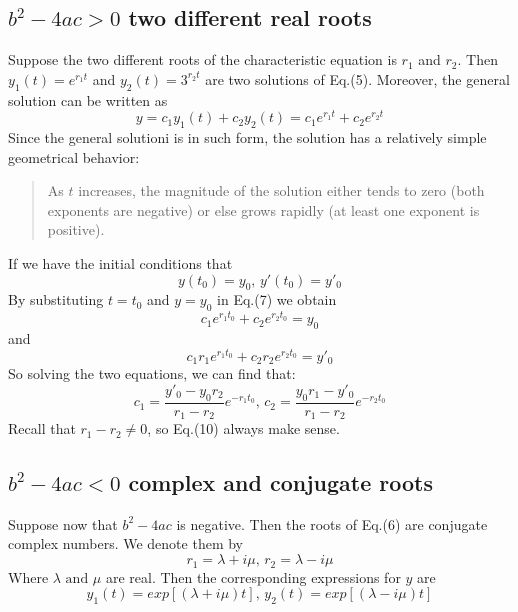 \documentclass{article}
\begin{document}
\subsection{$b^2 - 4ac > 0$ two different real roots}
Suppose the two different roots of the characteristic equation is $r_1$ and $r_2$. Then $y_1(t) = e^{r_1t}$ and $y_2(t) = 3^{r_2t}$ are two solutions of Eq.(5). Moreover, the general solution can be written as 
\begin{equation}
	y = c_1y_1(t) + c_2y_2(t) = c_1e^{r_1t}+c_2e^{r_2t}
\end{equation}
Since the general solutioni is in such form, the solution has a relatively simple geometrical behavior: 
\begin{quote}
	As $t$ increases, the magnitude of the solution either tends to zero (both exponents are negative) or else grows rapidly (at least one exponent is positive).
\end{quote}
If we have the initial conditions that \[y(t_0) = y_0\text{,  } y'(t_0) = y'_0\]
By substituting $t=t_0$ and $y = y_0$ in Eq.(7) we obtain
\begin{equation}
	c_1e^{r_1t_0}+c_2e^{r_2t_0} = y_0
\end{equation}
and
\begin{equation}
	c_1r_1e^{r_1t_0}+c_2r_2e^{r_2t_0} = y'_0
\end{equation}
So solving the two equations, we can find that:
\begin{equation}
	c_1 = \frac{y'_0-y_0r_2}{r_1-r_2}e^{-r_1t_0} \text{,  } c_2 = \frac{y_0r_1-y'_0}{r_1-r_2}e^{-r_2t_0}
\end{equation}
Recall that $r_1-r_2 \neq 0$, so Eq.(10) always make sense.


\subsection{$b^2 - 4ac < 0$ complex and conjugate roots}
Suppose now that $b^2-4ac$ is negative. Then the roots of Eq.(6) are conjugate complex numbers.
We denote them by 
\begin{equation}
	r_1 = \lambda + i\mu\text{,  } r_2 = \lambda -i\mu
\end{equation}
Where $\lambda\text{ and }\mu$ are real. Then the corresponding expressions for $y$ are
\begin{equation}
	y_1(t) = exp\left[(\lambda+i\mu)t\right]\text{,  } 	y_2(t) = exp\left[(\lambda-i\mu)t\right]
\end{equation}
\end{document}
